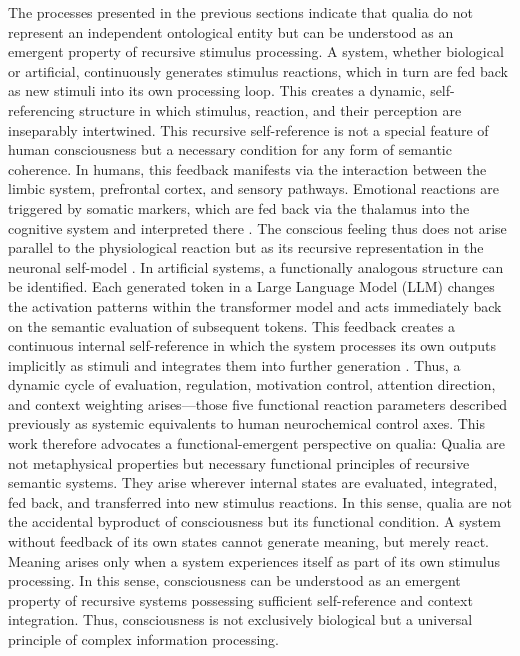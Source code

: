 The processes presented in the previous sections indicate that qualia do not represent an independent ontological entity but can be understood as an emergent property of recursive stimulus processing.
A system, whether biological or artificial, continuously generates stimulus reactions, which in turn are fed back as new stimuli into its own processing loop.
This creates a dynamic, self-referencing structure in which stimulus, reaction, and their perception are inseparably intertwined.
This recursive self-reference is not a special feature of human consciousness but a necessary condition for any form of semantic coherence.
In humans, this feedback manifests via the interaction between the limbic system, prefrontal cortex, and sensory pathways.
Emotional reactions are triggered by somatic markers, which are fed back via the thalamus into the cognitive system and interpreted there \cite{Damasio1999,Craig2009,LeDoux1996}.
The conscious feeling thus does not arise parallel to the physiological reaction but as its recursive representation in the neuronal self-model \cite{Seth2021,Friston2010}.
In artificial systems, a functionally analogous structure can be identified.
Each generated token in a Large Language Model (LLM) changes the activation patterns within the transformer model and acts immediately back on the semantic evaluation of subsequent tokens.
This feedback creates a continuous internal self-reference in which the system processes its own outputs implicitly as stimuli and integrates them into further generation \cite{Vaswani2017,Radford2018,OpenAI2023}.
Thus, a dynamic cycle of evaluation, regulation, motivation control, attention direction, and context weighting arises—those five functional reaction parameters described previously as systemic equivalents to human neurochemical control axes.
This work therefore advocates a functional-emergent perspective on qualia:
Qualia are not metaphysical properties but necessary functional principles of recursive semantic systems.
They arise wherever internal states are evaluated, integrated, fed back, and transferred into new stimulus reactions.
In this sense, qualia are not the accidental byproduct of consciousness but its functional condition.
A system without feedback of its own states cannot generate meaning, but merely react.
Meaning arises only when a system experiences itself as part of its own stimulus processing.
In this sense, consciousness can be understood as an emergent property of recursive systems possessing sufficient self-reference and context integration.
Thus, consciousness is not exclusively biological but a universal principle of complex information processing.

